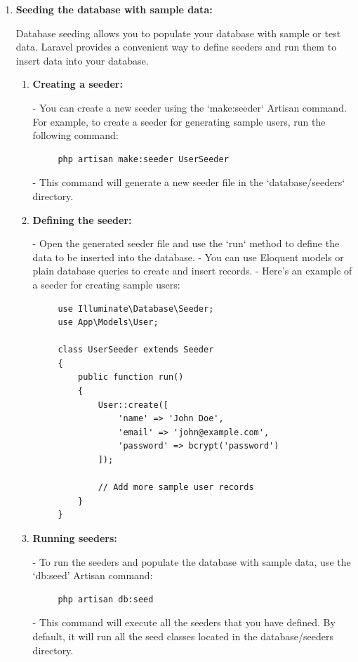 \begin{enumerate}
\begin{enumerate}
- To run migrations and apply the changes to the database, use the `migrate` Artisan command:
   \begin{verbatim}
     php artisan migrate
    \end{verbatim}
   - This command will execute any pending migrations and update the database schema accordingly.
\end{enumerate}

\item \textbf{Seeding the database with sample data:}

\medskip Database seeding allows you to populate your database with sample or test data. Laravel provides a convenient way to define seeders and run them to insert data into your database.
\begin{enumerate}
    \item \textbf{Creating a seeder:}
   
    - You can create a new seeder using the `make:seeder` Artisan command. For example, to create a seeder for generating sample users, run the following command:
   \begin{verbatim}
     php artisan make:seeder UserSeeder
    \end{verbatim}
   - This command will generate a new seeder file in the `database/seeders` directory.

   \item \textbf{Defining the seeder:}
   
   - Open the generated seeder file and use the `run` method to define the data to be inserted into the database.
   - You can use Eloquent models or plain database queries to create and insert records.
   - Here's an example of a seeder for creating sample users:
\begin{verbatim}
     use Illuminate\Database\Seeder;
     use App\Models\User;

     class UserSeeder extends Seeder
     {
         public function run()
         {
             User::create([
                 'name' => 'John Doe',
                 'email' => 'john@example.com',
                 'password' => bcrypt('password')
             ]);

             // Add more sample user records
         }
     }
\end{verbatim}

\item \textbf{Running seeders:}
   
- To run the seeders and populate the database with sample data, use the `db:seed' Artisan command:
   \begin{verbatim}
     php artisan db:seed
    \end{verbatim}
   - This command will execute all the seeders that you have defined. By default, it will run all the seed classes located in the database/seeders directory.


\end{enumerate}
\end{enumerate}
